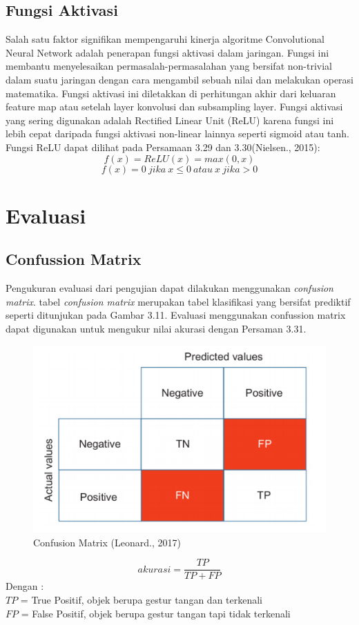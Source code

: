 \subsection{Fungsi Aktivasi}
Salah satu faktor signifikan mempengaruhi kinerja algoritme Convolutional Neural Network adalah penerapan fungsi aktivasi dalam jaringan. Fungsi ini membantu menyelesaikan permasalah-permasalahan yang bersifat non-trivial dalam suatu jaringan dengan cara mengambil sebuah nilai dan melakukan operasi matematika. Fungsi aktivasi ini diletakkan di perhitungan akhir dari keluaran feature map atau setelah layer konvolusi dan subsampling layer. Fungsi aktivasi yang sering digunakan adalah Rectified Linear Unit (ReLU) karena fungsi ini lebih cepat daripada fungsi aktivasi non-linear lainnya seperti sigmoid atau tanh. Fungsi ReLU dapat dilihat pada Persamaan 3.29 dan 3.30(Nielsen., 2015):
\begin{equation}
f(x) = ReLU(x) =max(0,x)
\end{equation}
\begin{equation}
	f(x)= 0 \ jika \ x \leq{0} \ atau \ x \ jika > 0
\end{equation}
\section{Evaluasi}
\subsection{Confussion Matrix}
Pengukuran evaluasi dari pengujian dapat dilakukan menggunakan \emph{confusion matrix}. tabel \emph{confusion matrix} merupakan tabel klasifikasi yang bersifat prediktif seperti ditunjukan pada Gambar 3.11. Evaluasi menggunakan confussion matrix dapat digunakan untuk mengukur nilai akurasi dengan Persaman 3.31.
\begin{figure}[H]
\centering
\includegraphics[width=0.7\linewidth]{confusion}
\caption{Confusion Matrix (Leonard., 2017)}
\label{fig:confusion}
\end{figure}
\begin{equation}
akurasi = \frac{TP}{TP+FP}
\end{equation}
Dengan :\\
$TP$ = True Positif, objek berupa gestur tangan dan terkenali\\
$FP$ = False Positif, objek berupa gestur tangan tapi tidak terkenali
